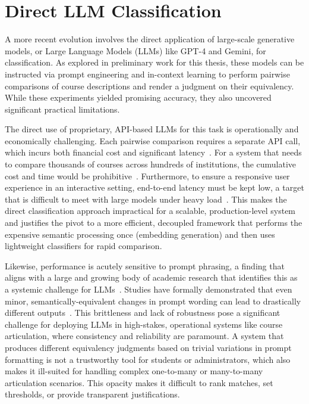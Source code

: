 \section{Direct LLM Classification}\label{ch:2.4}
A more recent evolution involves the direct application of large-scale generative models, or Large Language Models (LLMs) like GPT-4 and Gemini, for classification.  As explored in preliminary work for this thesis, these models can be instructed via prompt engineering and in-context learning to perform pairwise comparisons of course descriptions and render a judgment on their equivalency.  While these experiments yielded promising accuracy, they also uncovered significant practical limitations.

The direct use of proprietary, API-based LLMs for this task is operationally and economically challenging. Each pairwise comparison requires a separate API call, which incurs both financial cost and significant latency~\cite{Sharma_2025,nvidia_2025}. For a system that needs to compare thousands of courses across hundreds of institutions, the cumulative cost and time would be prohibitive~\cite{Sharma_2025,nvidia_2025}. Furthermore, to ensure a responsive user experience in an interactive setting, end-to-end latency must be kept low, a target that is difficult to meet with large models under heavy load~\cite{nvidia_2025,Sharma_2025}. This makes the direct classification approach impractical for a scalable, production-level system and justifies the pivot to a more efficient, decoupled framework that performs the expensive semantic processing once (embedding generation) and then uses lightweight classifiers for rapid comparison.

Likewise, performance is acutely sensitive to prompt phrasing, a finding that aligns with a large and growing body of academic research that identifies this as a systemic challenge for LLMs~\cite{razavi2025benchmarkingpromptsensitivitylarge,zhuo-etal-2024-prosa}. Studies have formally demonstrated that even minor, semantically-equivalent changes in prompt wording can lead to drastically different outputs~\cite{razavi2025benchmarkingpromptsensitivitylarge,zhuo-etal-2024-prosa}. This brittleness and lack of robustness pose a significant challenge for deploying LLMs in high-stakes, operational systems like course articulation, where consistency and reliability are paramount. A system that produces different equivalency judgments based on trivial variations in prompt formatting is not a trustworthy tool for students or administrators, which also makes it ill-suited for handling complex one-to-many or many-to-many articulation scenarios.  This opacity makes it difficult to rank matches, set thresholds, or provide transparent justifications.

